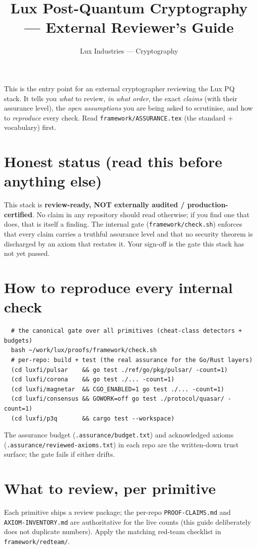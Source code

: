 \documentclass[11pt]{article}
\title{Lux Post-Quantum Cryptography --- External Reviewer's Guide}
\author{Lux Industries --- Cryptography}
\date{}
\begin{document}
\maketitle

\noindent This is the entry point for an external cryptographer reviewing the
Lux PQ stack. It tells you \emph{what} to review, \emph{in what order}, the
exact \emph{claims} (with their assurance level), the \emph{open assumptions}
you are being asked to scrutinise, and how to \emph{reproduce} every check.
Read \texttt{framework/ASSURANCE.tex} (the standard + vocabulary) first.

\section{Honest status (read this before anything else)}
This stack is \textbf{review-ready, NOT externally audited / production-
certified}. No claim in any repository should read otherwise; if you find one
that does, that is itself a finding. The internal gate
(\texttt{framework/check.sh}) enforces that every claim carries a truthful
assurance level and that no security theorem is discharged by an axiom that
restates it. Your sign-off is the gate this stack has not yet passed.

\section{How to reproduce every internal check}
\begin{verbatim}
  # the canonical gate over all primitives (cheat-class detectors + budgets)
  bash ~/work/lux/proofs/framework/check.sh
  # per-repo: build + test (the real assurance for the Go/Rust layers)
  (cd luxfi/pulsar    && go test ./ref/go/pkg/pulsar/ -count=1)
  (cd luxfi/corona    && go test ./... -count=1)
  (cd luxfi/magnetar  && CGO_ENABLED=1 go test ./... -count=1)
  (cd luxfi/consensus && GOWORK=off go test ./protocol/quasar/ -count=1)
  (cd luxfi/p3q       && cargo test --workspace)
\end{verbatim}
The assurance budget (\texttt{.assurance/budget.txt}) and acknowledged axioms
(\texttt{.assurance/reviewed-axioms.txt}) in each repo are the written-down
trust surface; the gate fails if either drifts.

\section{What to review, per primitive}
Each primitive ships a review package; the per-repo \texttt{PROOF-CLAIMS.md}
and \texttt{AXIOM-INVENTORY.md} are authoritative for the live counts (this
guide deliberately does not duplicate numbers). Apply the matching red-team
checklist in \texttt{framework/redteam/}.
\end{document}
